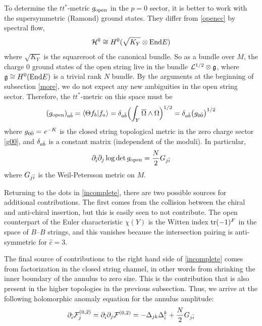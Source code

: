 To determine the $tt^*$-metric $g_{\rm open}$ in the $p=0$ sector,
it is better to work with the supersymmetric (Ramond) ground states. 
They differ from \eqref{opencc} by spectral flow,
\begin{equation}
\eqlabel{openrgs}
\calh^0 \cong H^0(\sqrt{K_Y}\otimes {\rm End}E)
\end{equation}
where $\sqrt{K_Y}$ is the squareroot of the canonical bundle. So as 
a bundle over $M$, the charge $0$ ground states of the open string 
live in the bundle ${\cal L}^{1/2}\otimes {\mathfrak g}$, where 
${\mathfrak g}\cong H^0({\rm End}E)$ is a trivial rank $N$ bundle. 
By the arguments at the beginning of subsection \ref{more}, we do 
not expect any new ambiguities in the open string sector. 
Therefore, the $tt^*$-metric on this space must be
\begin{equation}
(g_{\rm open})_{a\bb} = \langle \Theta f_b|f_a\rangle = \delta_{a\bb} 
\Bigl(\int_Y\Omegab\wedge\Omega\Bigr)^{1/2} = \delta_{a\bb} 
\bigl(g_{0\0b}\bigr)^{1/2}
\end{equation}
where $g_{0\0b}=\ee^{-K}$ is the closed string topological metric
in the zero charge sector \eqref{g00}, and $\delta_{a{\bar b}}$ is a 
constant matrix (independent of the moduli). In particular,
\begin{equation}
\partial_{\bar i}\partial_j \log\det g_{\rm open} = \frac N2 G_{j{\bar i}}
\end{equation}
where $G_{j{\bar i}}$ is the Weil-Petersson metric on $M$.

Returning to the dots in \eqref{incomplete}, there are two possible
sources for additional contributions. The first comes from the
collision between the chiral and anti-chiral insertion, but this
is easily seen to not contribute. The open counterpart
of the Euler characteristic $\chi(Y)$ is the Witten index 
${\rm tr}(-1)^F$ in the space of $B$--$B$ strings, and this 
vanishes because the intersection pairing is anti-symmetric
for $\hat c=3$.

The final source of contributions to the right hand side of
\eqref{incomplete} comes from factorization in the closed
string channel, in other words from shrinking the inner
boundary of the annulus to zero size. This is the contribution
that is also present in the higher topologies in the previous
subsection. Thus, we arrive at the following holomorphic anomaly 
equation for the annulus amplitude:
\begin{equation}
\eqlabel{annhan}
\del_\ib \F 02_j =
\del_\ib\del_j \F 02 = - \Delta_{jk}\Delta_{\ib}^k + \frac N2 G_{j\ib}
\end{equation}

